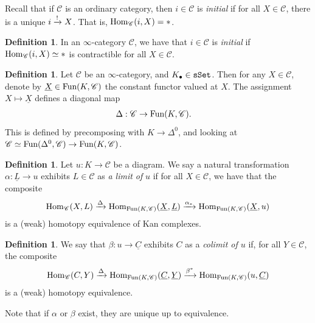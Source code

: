 \documentclass[12pt]{amsart}
\theoremstyle{definition}
\newtheorem{definition}[theorem]{Definition}
\begin{document}
Recall that if $\mathscr{C}$ is an ordinary category, then $i\in \mathscr{C}$ is \textit{initial} if for all $X\in \mathscr{C}$, there is a unique $i \xrightarrow{!} X$. That is, $\text{Hom}_\mathscr{C}(i,X) = \ast$.

\begin{definition} In an $\infty$-category $\mathscr{C}$, we have that $i\in \mathscr{C}$ is \textit{initial} if $\text{Hom}_\mathscr{C}(i,X) \simeq \ast$ is contractible for all $X\in \mathscr{C}$.
\end{definition}

\begin{definition} Let $\mathscr{C}$ be an $\infty$-category, and $K_\bullet\in\texttt{sSet}$. Then for any $X\in \mathscr{C}$, denote by $\underline{X}\in\text{Fun}(K,\mathscr{C})$ the constant functor valued at $X$. The assignment $X \mapsto \underline{X}$ defines a diagonal map
\begin{align*}
    \Delta: \mathscr{C} &\to \text{Fun}(K,\mathscr{C}).
\end{align*}
This is defined by precomposing with $K\to \Delta^0$, and looking at $\mathscr{C} \simeq \text{Fun}(\Delta^0,\mathscr{C}) \to \text{Fun}(K,\mathscr{C})$.
\end{definition}

\begin{definition} Let $u:K\to \mathscr{C}$ be a diagram. We say a natural transformation $\alpha: \underline{L}\to u$ exhibits $L\in \mathscr{C}$ as \textit{a limit of} $u$ if for all $X\in \mathscr{C}$, we have that the composite
\begin{align*}
    \text{Hom}_\mathscr{C}(X,L) \xrightarrow{\Delta} \text{Hom}_{\text{Fun}(K,\mathscr{C})}(\underline{X}, \underline{L}) \xrightarrow{\alpha_\ast} \text{Hom}_{\text{Fun}(K,\mathscr{C})}(\underline{X}, u)
\end{align*}
is a (weak) homotopy equivalence of Kan complexes.
\end{definition}

\begin{definition} We say that $\beta: u \to \underline{C}$ exhibits $C$ as a \textit{colimit of $u$} if, for all $Y\in \mathscr{C}$, the composite
\begin{align*}
    \text{Hom}_\mathscr{C}(C,Y) \xrightarrow{\Delta} \text{Hom}_{\text{Fun}(K,\mathscr{C})}(\underline{C}, \underline{Y}) \xrightarrow{\beta^\ast} \text{Hom}_{\text{Fun}(K,\mathscr{C})}(u,\underline{C})
\end{align*}
is a (weak) homotopy equivalence.
\end{definition}
Note that if $\alpha$ or $\beta$ exist, they are unique up to equivalence.
\end{document}

